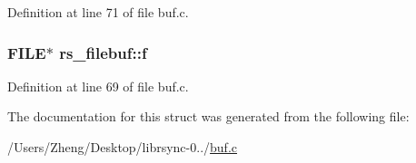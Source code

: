 Definition at line 71 of file buf.\+c.

\hypertarget{structrs__filebuf_a85a798132d00137243988597857297c5}{}
\subsubsection[{f}]{\setlength{\rightskip}{0pt plus 5cm}F\+I\+L\+E$\ast$ rs\+\_\+filebuf\+::f}\label{structrs__filebuf_a85a798132d00137243988597857297c5}


Definition at line 69 of file buf.\+c.



The documentation for this struct was generated from the following file\+:\begin{DoxyCompactItemize}
\item 
/\+Users/\+Zheng/\+Desktop/librsync-\/0../\hyperlink{buf_8c}{buf.\+c}\end{DoxyCompactItemize}
